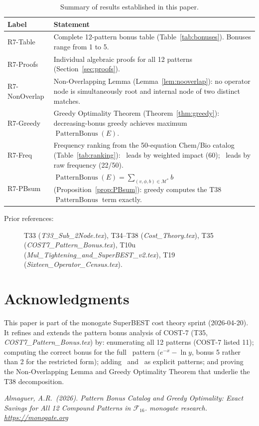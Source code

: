 \documentclass[12pt,a4paper]{article}
\theoremstyle{definition}
\newcommand{\EXL}{\operatorname{EXL}}
\newcommand{\EMN}{\operatorname{EMN}}
\newcommand{\DEML}{\operatorname{DEML}}
\newcommand{\LEprod}{\operatorname{LEprod}}
\newcommand{\PB}{\operatorname{PatternBonus}}
\begin{document}
\begin{table}[h]
\centering
\caption{Summary of results established in this paper.}
\label{tab:summary}
\smallskip
\begin{tabular}{@{}lL{10cm}@{}}
\toprule
\textbf{Label} & \textbf{Statement} \\
\midrule
R7-Table    & Complete 12-pattern bonus table (Table~\ref{tab:bonuses}).
              Bonuses range from 1 to 5. \\[4pt]
R7-Proofs   & Individual algebraic proofs for all 12 patterns
              (Section~\ref{sec:proofs}). \\[4pt]
R7-NonOverlap & Non-Overlapping Lemma (Lemma~\ref{lem:nooverlap}):
              no operator node is simultaneously root and internal node
              of two distinct matches. \\[4pt]
R7-Greedy   & Greedy Optimality Theorem (Theorem~\ref{thm:greedy}):
              decreasing-bonus greedy achieves maximum $\PB(E)$. \\[4pt]
R7-Freq     & Frequency ranking from the 50-equation Chem/Bio catalog
              (Table~\ref{tab:ranking}): \EXL\ leads by weighted impact
              (60); \DEML\ leads by raw frequency (22/50). \\[4pt]
R7-PBsum    & $\PB(E) = \sum_{(v,\phi,b)\in\mathcal{M}^*} b$
              (Proposition~\ref{prop:PBsum}): greedy computes the T38
              $\PB$ term exactly. \\
\bottomrule
\end{tabular}
\end{table}

\begin{description}
  \item[Prior references:]
        T33 (\textit{T33\_Sub\_2Node.tex}),
        T34--T38 (\textit{Cost\_Theory.tex}),
        T35 (\textit{COST7\_Pattern\_Bonus.tex}),
        T10u (\textit{Mul\_Tightening\_and\_SuperBEST\_v2.tex}),
        T19 (\textit{Sixteen\_Operator\_Census.tex}).
\end{description}

\section*{Acknowledgments}

This paper is part of the monogate SuperBEST cost theory sprint
(2026-04-20).
It refines and extends the pattern bonus analysis of COST-7
(T35, \textit{COST7\_Pattern\_Bonus.tex}) by: enumerating all 12
patterns (COST-7 listed 11); computing the correct bonus for the full
\DEML\ pattern ($e^{-x}-\ln y$, bonus 5 rather than 2 for the restricted
form); adding \LEprod\ and \EMN\ as explicit patterns; and proving the
Non-Overlapping Lemma and Greedy Optimality Theorem that underlie the
T38 decomposition.

\bigskip
\noindent\textit{Almaguer, A.R.\ (2026).
Pattern Bonus Catalog and Greedy Optimality:
Exact Savings for All 12 Compound Patterns in $\mathcal{F}_{16}$.
monogate research. \url{https://monogate.org}}
\end{document}
